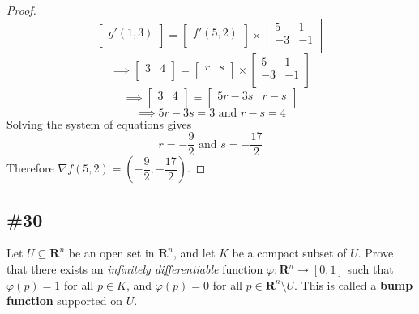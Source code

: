 \documentclass{article}
\newcommand{\R}{\mathbf{R}}
\theoremstyle{plain} %
\numberwithin{thm}{section} %
\theoremstyle{definition}
\begin{document}
\begin{proof}
            \[
                \begin{bmatrix}
                    g'(1,3) \\
                \end{bmatrix}
                =
                \begin{bmatrix}
                    f'(5,2) \\
                \end{bmatrix}
                \times 
                \begin{bmatrix}
                    5 &  1 \\
                    -3 &  -1 \\
                \end{bmatrix}
            \]
            \[
                \implies \begin{bmatrix}
                    3 &  4 \\
                \end{bmatrix}
                = 
                \begin{bmatrix}
                    r &  s \\
                \end{bmatrix}
                \times 
                \begin{bmatrix}
                    5 &  1 \\
                    -3 &  -1 \\
                \end{bmatrix}
            \]
            \[
                \implies \begin{bmatrix}
                    3 &  4 \\
                \end{bmatrix}
                = 
                \begin{bmatrix}
                    5r-3s &  r-s \\
                \end{bmatrix}
            \]
            \[
                \implies 5r - 3s = 3 \text{ and } r - s = 4
            \]
            Solving the system of equations gives
            \[
                r = -\frac{9}{2} \text{ and } s = -\frac{17}{2}
            \]
            Therefore \(\nabla f(5,2) = \left( -\dfrac{9}{2}, -\dfrac{17}{2} \right)\).
        \end{proof}
        \newpage
        \subsection{\#30}
        Let $U\subseteq \R^n$ be an open set in $\R^n$, and let $K$ be a compact subset of $U$. Prove that there exists an \textit{infinitely differentiable} function $\varphi:\R^n\rightarrow [0,1]$ such that $\varphi(p)=1$ for all $p\in K$, and $\varphi(p)=0$ for all $p\in \R^n\setminus U$. This is called a \textbf{bump function} supported on $U$.
\end{document}
